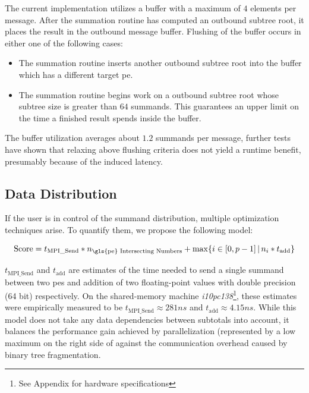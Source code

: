 The current implementation utilizes a buffer with a maximum of $4$ elements per message.
After the summation routine has computed an outbound subtree root, it places the result in the outbound message buffer.
Flushing of the buffer occurs in either one of the following cases: \begin{itemize} 
\item The summation routine inserts another outbound subtree root into the buffer which has a different target \gls{pe}.
\item The summation routine begins work on a outbound subtree root whose subtree size is greater than $64$ summands. This guarantees an upper limit on the time a finished result spends inside the buffer.
\end{itemize}

The buffer utilization averages about $1.2$ summands per message, further tests have shown that relaxing above flushing criteria does not yield a runtime benefit, presumably because of the induced latency.

\subsection{Data Distribution}
\label{sec:DataDistribution}

If the user is in control of the summand distribution, multiple optimization techniques arise. To quantify them, we propose the following model:

\begin{equation}
\label{eq:distributionScore}
\textrm{Score} = t_{\textrm{MPI\_Send}} * n_{\textrm{\gls{pe} Intersecting Numbers}} + \max \{ i \in [0, p - 1]\, |\, n_i * t_{\textrm{add}} \}
\end{equation}

$t_{\textrm{MPI\_Send}}$ and $t_\textrm{add}$ are estimates of the time needed to send a single summand between two \glspl{pe} and addition of two
floating-point values with double precision (64 bit) respectively. On the shared-memory machine \textit{i10pc138}\footnote{See Appendix for hardware specifications}, these
estimates were empirically measured to be $t_{\textrm{MPI\_Send}} \approx 281ns$ and $t_\textrm{add} \approx 4.15ns$. While this model does not
take any data dependencies between subtotals into account, it balances the performance gain achieved by parallelization (represented by a low maximum
on the right side of  against the communication overhead caused by binary tree fragmentation. 

